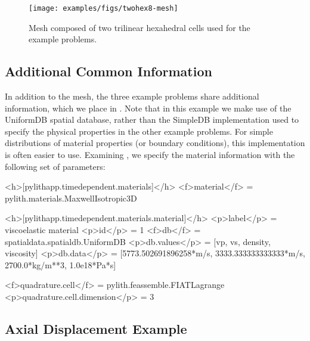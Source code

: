 \begin{figure}
  \texttt{[image: examples/figs/twohex8-mesh]}
  \caption{Mesh composed of two trilinear hexahedral cells used for
    the example problems.}
  \label{fig:twohex8-mesh}
\end{figure}


\subsection{Additional Common Information}

In addition to the mesh, the three example problems share additional
information, which we place in . Note that in
this example we make use of the UniformDB spatial database, rather
than the SimpleDB implementation used to specify the physical properties
in the other example problems. For simple distributions of material
properties (or boundary conditions), this implementation is often
easier to use. Examining , we specify the material
information with the following set of parameters:
\begin{cfg}
<h>[pylithapp.timedependent.materials]</h>
<f>material</f> = pylith.materials.MaxwellIsotropic3D

<h>[pylithapp.timedependent.materials.material]</h>
<p>label</p> = viscoelastic material
<p>id</p> = 1
<f>db</f> = spatialdata.spatialdb.UniformDB
<p>db.values</p> = [vp, vs, density, viscosity]
<p>db.data</p> = [5773.502691896258*m/s, 3333.333333333333*m/s, 2700.0*kg/m**3, 1.0e18*Pa*s]

<f>quadrature.cell</f> = pylith.feassemble.FIATLagrange
<p>quadrature.cell.dimension</p> = 3
\end{cfg}

\subsection{Axial Displacement Example}

